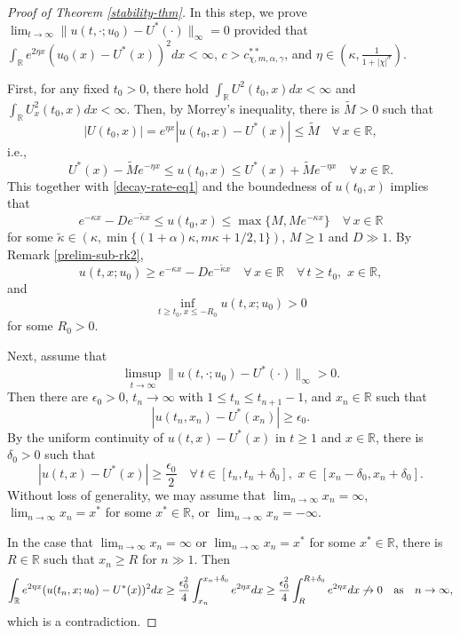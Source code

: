 \documentclass[11pt]{article} %
\theoremstyle{remark}
\theoremstyle{remark}
\numberwithin{equation}{section}
\numberwithin{figure}{section}
\numberwithin{table}{section}
\newcommand\RR{\ensuremath{\mathbb{R}}}
\begin{document}
\begin{proof}[Proof of Theorem \ref{stability-thm}]
 In this step, we prove $\lim_{t\to\infty}\|u(t,\cdot;u_0)-U^*(\cdot)\|_\infty=0$
provided that $\int_{\RR} e^{2\eta x}(u_0(x)-U^*(x))^2 dx<\infty$, 
$c>c_{\chi,m,\alpha, \gamma}^{**}$, and $\eta\in (\kappa,\frac{1}{1+|\chi|^\sigma})$.


\smallskip
First,  for any fixed $t_0>0$,  there hold $\int_{\mathbb{R}}U^2(t_0,x)dx<\infty$ and 
$\int_{\mathbb{R}} U_x^2(t_0,x)dx<\infty$. Then, by Morrey's inequality,
there is $\widetilde M>0$ such that
$$
|U(t_0,x)|=e^{\eta x}|u(t_0,x)-U^*(x)|\le \widetilde M\quad \forall\, x\in\mathbb{R},
$$
i.e.,
$$
U^*(x)-\widetilde M e^{-\eta x} \le u(t_0,x)\le U^*(x)+\widetilde M e^{-\eta x}\quad \forall\, x\in\mathbb{R}.
$$
This together with \eqref{decay-rate-eq1}  and the boundedness of $u(t_0,x)$  implies that
\begin{equation}
\label{u-t0-eq}
e^{-\kappa x}-De^{-\tilde\kappa x}\le u(t_0,x)\le \max\{M,M e^{-\kappa x}\}\quad \forall\, x\in\mathbb{R}
\end{equation}
for some  $\tilde \kappa \in (\kappa,  \min\{(1+\alpha)\kappa, m\kappa+1/2,1\})$, $M\ge 1$ and $D\gg 1$.
By Remark \ref{prelim-sub-rk2}, 
$$
u(t,x;u_0)\ge  e^{-\kappa x}-D e^{-\tilde \kappa x}\quad \forall\, x\in\mathbb{R}\quad \forall\, t\ge t_0,\,\, x\in\mathbb{R},
$$
and  
\begin{equation}
\label{lower-bound-eq1}
 \inf_{t\ge t_0,x\le -R_0} u(t,x;u_0)>0
\end{equation}
for some $R_0>0$.



Next, assume that 
$$
\limsup_{t\to\infty} \|u(t,\cdot;u_0)-U^*(\cdot)\|_\infty>0.
$$
Then there are $\epsilon_0>0$, $t_n\to\infty$ with $1\le t_n\le t_{n+1}-1$, and $x_n\in\mathbb{R}$ such that
$$
|u(t_n,x_n)-U^*(x_n)|\ge \epsilon_0.
$$
By the uniform continuity of $u(t,x)-U^*(x)$ in $t\ge 1$ and $x\in\mathbb{R}$, there is $\delta_0>0$ such that
$$
|u(t,x)-U^*(x)|\ge \frac{\epsilon_0}{2}\quad \forall\, t\in [t_n,t_n+\delta_0],\,\, x\in [x_n-\delta_0,x_n+\delta_0].
$$
Without loss of generality, we may assume that 
$\lim_{n\to\infty} x_n=\infty$, $\lim_{n\to\infty }x_n=x^*$ for some $x^*\in\mathbb{R}$, or
$\lim_{n\to\infty} x_n=-\infty$.

In the case that $\lim_{n\to\infty} x_n=\infty$ or $\lim_{n\to\infty} x_n=x^*$ for some $x^*\in\mathbb{R}$, there is $R\in\mathbb{R}$
such that $x_n\ge R$ for $n\gg 1$.  
Then
$$
\int_{\RR} e^{2\eta x} (u(t_n,x;u_0)-U^*(x))^2 dx\ge
\frac{\epsilon_0^2}{4} \int_{x_n}^{x_n+\delta_0} e^{2\eta x}dx \ge \frac{\epsilon_0^2}{4}\int_{R}^{R+\delta_0} e^{2\eta x}dx \not \to 0
\quad {\rm as}\quad n\to\infty,
$$
 which is a contradiction. 



\end{proof}
\end{document}
